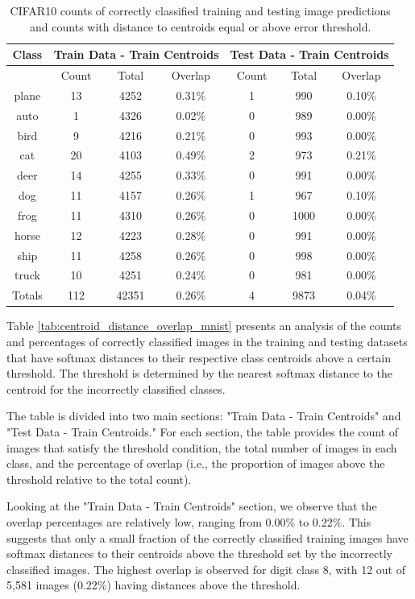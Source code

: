 \begin{table}[htbp]
\centering
\begin{tabular}{|c|c|c|c|c|c|c|}
\hline
Class & \multicolumn{3}{c|}{Train Data - Train Centroids} & \multicolumn{3}{c|}{Test Data - Train Centroids} \\
\hline
 & Count & Total & Overlap & Count & Total & Overlap \\
\hline
plane & 13 & 4252 & 0.31\% & 1 & 990 & 0.10\% \\
auto & 1 & 4326 & 0.02\% & 0 & 989 & 0.00\% \\
bird & 9 & 4216 & 0.21\% & 0 & 993 & 0.00\% \\
cat & 20 & 4103 & 0.49\% & 2 & 973 & 0.21\% \\
deer & 14 & 4255 & 0.33\% & 0 & 991 & 0.00\% \\
dog & 11 & 4157 & 0.26\% & 1 & 967 & 0.10\% \\
frog & 11 & 4310 & 0.26\% & 0 & 1000 & 0.00\% \\
horse & 12 & 4223 & 0.28\% & 0 & 991 & 0.00\% \\
ship & 11 & 4258 & 0.26\% & 0 & 998 & 0.00\% \\
truck & 10 & 4251 & 0.24\% & 0 & 981 & 0.00\% \\
\hline
Totals & 112 & 42351 & 0.26\% & 4 & 9873 & 0.04\% \\
\hline
\end{tabular}
\caption{CIFAR10 counts of correctly classified training and testing image predictions and counts with distance to centroids equal or above error threshold.}
\label{tab:centroid_distance_overlap}
\end{table}

Table \ref{tab:centroid_distance_overlap_mnist} presents an analysis of the counts and percentages of correctly classified images in the training and testing datasets that have softmax distances to their respective class centroids above a certain threshold. The threshold is determined by the nearest softmax distance to the centroid for the incorrectly classified classes.

The table is divided into two main sections: "Train Data - Train Centroids" and "Test Data - Train Centroids." For each section, the table provides the count of images that satisfy the threshold condition, the total number of images in each class, and the percentage of overlap (i.e., the proportion of images above the threshold relative to the total count).

Looking at the "Train Data - Train Centroids" section, we observe that the overlap percentages are relatively low, ranging from 0.00\% to 0.22\%. This suggests that only a small fraction of the correctly classified training images have softmax distances to their centroids above the threshold set by the incorrectly classified images. The highest overlap is observed for digit class 8, with 12 out of 5,581 images (0.22\%) having distances above the threshold.

